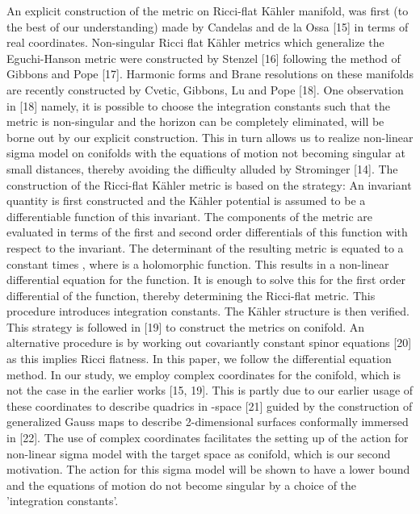 \documentclass[a4paper,12pt]{article}
\begin{document}
{An explicit construction of the metric on Ricci-flat K\"{a}hler manifold, was
first (to the best of our understanding) made by Candelas and de la Ossa [15]
in terms of real coordinates. Non-singular Ricci flat K\"{a}hler metrics which
generalize the Eguchi-Hanson metric were constructed by Stenzel [16] following
the method of Gibbons and Pope [17]. Harmonic forms and Brane resolutions  
on these manifolds are recently constructed by Cvetic, Gibbons, Lu and
 Pope [18]. 
One observation in [18] namely, it is possible to choose
the integration constants such that the metric is non-singular and the horizon
can be completely eliminated, will be borne out by our explicit construction.
This in turn allows us to realize non-linear sigma model on conifolds with the
equations of motion not becoming singular at small distances, thereby avoiding
the difficulty alluded by Strominger [14]. The construction of the Ricci-flat 
K\"{a}hler metric is based on the strategy: An \coordHE{} invariant quantity  
is first constructed and the K\"{a}hler potential is assumed to be a differentiable function of
this invariant. The components of the metric are evaluated in terms of the 
first and second order differentials of this function with respect to the 
invariant. The determinant of the resulting metric is equated to a constant 
times \coordHE{}, where \coordHE{} is a holomorphic function.  
This results in a non-linear differential equation for
the function. It is enough to solve this for the first order differential of 
the function, thereby determining the Ricci-flat metric. 
This procedure introduces integration constants.
The K\"{a}hler 
structure is then verified. This strategy is followed in [19] to construct the
metrics on conifold. An alternative procedure is by working out covariantly
constant spinor equations [20] as this implies Ricci flatness. In this paper,
we follow the differential equation method. In our study, we employ complex
coordinates for the conifold, which is not the case in the earlier works [15,
19]. 
This is partly due to our earlier usage of these
coordinates to describe quadrics in \coordHE{}-space [21] guided by the 
construction of generalized Gauss maps to describe 2-dimensional surfaces
conformally immersed in \coordHE{} [22]. The use of complex coordinates facilitates
the setting up of the action for non-linear sigma model with the target space
as conifold, which is our second motivation. The action for this sigma model   
will be shown to have a lower bound and the equations of motion do not 
become singular by a choice of the 'integration constants'.  

}
\end{document}
